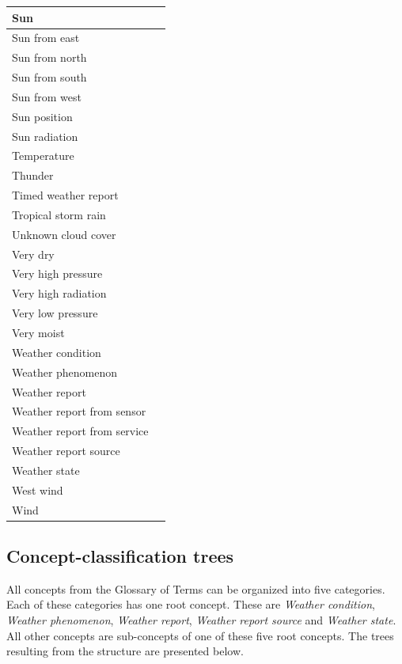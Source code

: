 \begin{longtable}{|p{}|p{}|}
  \hline
  Sun & \\
  \hline
  Sun from east & \\
  \hline
  Sun from north & \\
  \hline
  Sun from south & \\
  \hline
  Sun from west & \\
  \hline
  Sun position & \\
  \hline
  Sun radiation & \\
  \hline
  Temperature & \\
  \hline
  Thunder & \\
  \hline
  Timed weather report & \\
  \hline
  Tropical storm rain & \\
  \hline
  Unknown cloud cover & \\
  \hline
  Very dry & \\
  \hline
  Very high pressure & \\
  \hline
  Very high radiation & \\
  \hline
  Very low pressure & \\
  \hline
  Very moist & \\
  \hline
  Weather condition & \\
  \hline
  Weather phenomenon & \\
  \hline
  Weather report & \\
  \hline
  Weather report from sensor & \\
  \hline
  Weather report from service & \\
  \hline
  Weather report source & \\
  \hline
  Weather state & \\
  \hline
  West wind & \\
  \hline
  Wind & \\
  \hline
\end{longtable}

\subsection{Concept-classification trees}
\label{sec:concept_classification_trees}

All concepts from the Glossary of Terms can be organized into five categories. Each of these categories has one root concept. These are \emph{Weather condition}, \emph{Weather phenomenon}, \emph{Weather report}, \emph{Weather report source} and \emph{Weather state}. All other concepts are sub-concepts of one of these five root concepts. The trees resulting from the structure are presented below.

